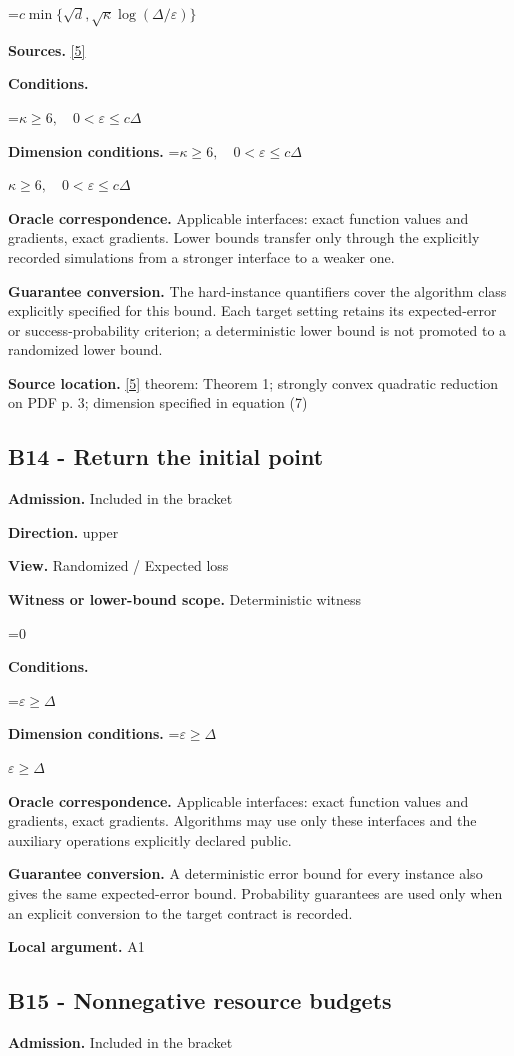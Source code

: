 \documentclass[10pt,a4paper]{article}
\newcommand{\AtlasMath}[1]{\par\begingroup\centering\setbox0=\hbox{$\displaystyle #1$}\ifdim\wd0>1.4\linewidth\typeout{ATLAS WIDE FORMULA: \the\wd0}\fi\ifdim\wd0>\linewidth\resizebox{\linewidth}{!}{\box0}\else\box0\fi\par\endgroup}
\newcommand{\AtlasInlineMath}[1]{\begingroup\setbox0=\hbox{$#1$}\ifdim\wd0>.4\linewidth\endgroup\AtlasMath{#1}\else\endgroup$#1$\fi}
\begin{document}
\AtlasMath{c\min\{\sqrt d,\sqrt\kappa\log(\Delta/\varepsilon)\}}
\textbf{Sources.} \href{https://arxiv.org/pdf/2609.10874}{[5]}

\textbf{Conditions.} 
\AtlasMath{\kappa\ge6,\quad0<\varepsilon\le c\Delta}


\textbf{Dimension conditions.} \AtlasInlineMath{\kappa\ge6,\quad0<\varepsilon\le c\Delta}

\textbf{Oracle correspondence.} Applicable interfaces: exact function values and gradients, exact gradients. Lower bounds transfer only through the explicitly recorded simulations from a stronger interface to a weaker one.

\textbf{Guarantee conversion.} The hard-instance quantifiers cover the algorithm class explicitly specified for this bound. Each target setting retains its expected-error or success-probability criterion; a deterministic lower bound is not promoted to a randomized lower bound.

\textbf{Source location.} \href{https://arxiv.org/pdf/2609.10874}{[5]} theorem: Theorem 1; strongly convex quadratic reduction on PDF p. 3; dimension specified in equation (7)

\subsection{B14 - Return the initial point}
\textbf{Admission.} Included in the bracket

\textbf{Direction.} upper

\textbf{View.} Randomized / Expected loss

\textbf{Witness or lower-bound scope.} Deterministic witness

\AtlasMath{0}
\textbf{Conditions.} 
\AtlasMath{\varepsilon\ge\Delta}


\textbf{Dimension conditions.} \AtlasInlineMath{\varepsilon\ge\Delta}

\textbf{Oracle correspondence.} Applicable interfaces: exact function values and gradients, exact gradients. Algorithms may use only these interfaces and the auxiliary operations explicitly declared public.

\textbf{Guarantee conversion.} A deterministic error bound for every instance also gives the same expected-error bound. Probability guarantees are used only when an explicit conversion to the target contract is recorded.

\textbf{Local argument.} A1

\subsection{B15 - Nonnegative resource budgets}
\textbf{Admission.} Included in the bracket
\end{document}
